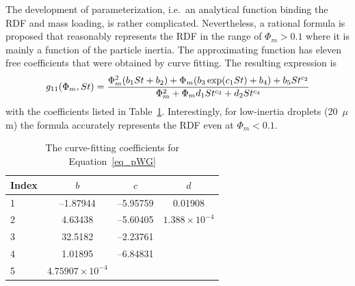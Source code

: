 \documentclass[../thesis.tex]{subfiles}
\begin{document}
The development of parameterization, i.e.\ an analytical function binding the RDF and mass loading, is rather complicated. Nevertheless, a rational formula is proposed that reasonably represents the RDF in the range of $\Phi_m>0.1$ where it is mainly a function of the particle inertia. The approximating function has eleven free coefficients that were obtained by curve fitting. The resulting expression is
\begin{equation}
g_{11}(\Phi_m, St)={{{\Phi_m^2 (b_1St+b_2)+\Phi_m (b_3\exp(c_1St)+b_4) }+b_5{St^{c_2}}} \over { \Phi_m^2+\Phi_m d_1St^{c_3}+d_2{St^{c_4}}}}
\label{eq_pWG}
\end{equation}
with the coefficients listed in Table~\ref{Table3}. Interestingly, for low-inertia droplets (20~$\mu$m) the formula accurately represents the RDF even at $\Phi_m<0.1$.
\begin{table}[!b]%
\center
\begin{tabular}{lccc}
\hline
Index & $b$ & $c$ & $d$ \\
\hline
1     &--1.87944 & --5.95759 & 0.01908 \\
2     &  4.63438 & --5.60405 & $1.388 \times 10^{-4}$ \\
3     &  32.5182 & --2.23761 &    \\
4     &  1.01895 & --6.84831 &     \\
5     &  $4.75907 \times 10^{-4}$ & & \\
\hline
\end{tabular}
\caption{The curve-fitting coefficients for Equation~\ref{eq_pWG}}
\label{Table3}
\end{table}%
\end{document}
